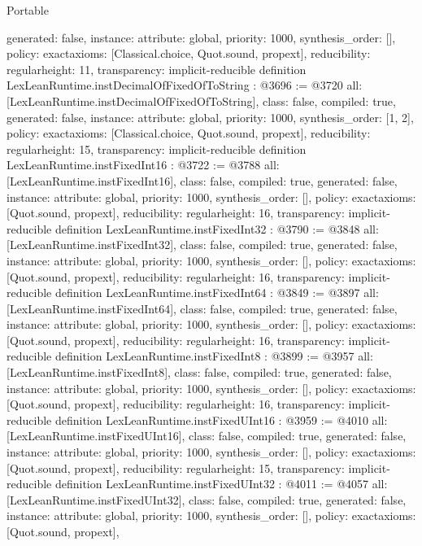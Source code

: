 \begin{lexlean}{Portable}
\begin{coremodule}
{  generated: false,
  instance: {attribute: global, priority: 1000, synthesis_order: []},
  policy: exact{axioms: [Classical.choice, Quot.sound, propext]},
  reducibility: regular{height: 11},
  transparency: implicit-reducible
}
definition LexLeanRuntime.instDecimalOfFixedOfToString : @3696 := @3720 {
  all: [LexLeanRuntime.instDecimalOfFixedOfToString],
  class: false,
  compiled: true,
  generated: false,
  instance: {attribute: global, priority: 1000, synthesis_order: [1, 2]},
  policy: exact{axioms: [Classical.choice, Quot.sound, propext]},
  reducibility: regular{height: 15},
  transparency: implicit-reducible
}
definition LexLeanRuntime.instFixedInt16 : @3722 := @3788 {
  all: [LexLeanRuntime.instFixedInt16],
  class: false,
  compiled: true,
  generated: false,
  instance: {attribute: global, priority: 1000, synthesis_order: []},
  policy: exact{axioms: [Quot.sound, propext]},
  reducibility: regular{height: 16},
  transparency: implicit-reducible
}
definition LexLeanRuntime.instFixedInt32 : @3790 := @3848 {
  all: [LexLeanRuntime.instFixedInt32],
  class: false,
  compiled: true,
  generated: false,
  instance: {attribute: global, priority: 1000, synthesis_order: []},
  policy: exact{axioms: [Quot.sound, propext]},
  reducibility: regular{height: 16},
  transparency: implicit-reducible
}
definition LexLeanRuntime.instFixedInt64 : @3849 := @3897 {
  all: [LexLeanRuntime.instFixedInt64],
  class: false,
  compiled: true,
  generated: false,
  instance: {attribute: global, priority: 1000, synthesis_order: []},
  policy: exact{axioms: [Quot.sound, propext]},
  reducibility: regular{height: 16},
  transparency: implicit-reducible
}
definition LexLeanRuntime.instFixedInt8 : @3899 := @3957 {
  all: [LexLeanRuntime.instFixedInt8],
  class: false,
  compiled: true,
  generated: false,
  instance: {attribute: global, priority: 1000, synthesis_order: []},
  policy: exact{axioms: [Quot.sound, propext]},
  reducibility: regular{height: 16},
  transparency: implicit-reducible
}
definition LexLeanRuntime.instFixedUInt16 : @3959 := @4010 {
  all: [LexLeanRuntime.instFixedUInt16],
  class: false,
  compiled: true,
  generated: false,
  instance: {attribute: global, priority: 1000, synthesis_order: []},
  policy: exact{axioms: [Quot.sound, propext]},
  reducibility: regular{height: 15},
  transparency: implicit-reducible
}
definition LexLeanRuntime.instFixedUInt32 : @4011 := @4057 {
  all: [LexLeanRuntime.instFixedUInt32],
  class: false,
  compiled: true,
  generated: false,
  instance: {attribute: global, priority: 1000, synthesis_order: []},
  policy: exact{axioms: [Quot.sound, propext]},
}
\end{coremodule}
\end{lexlean}
